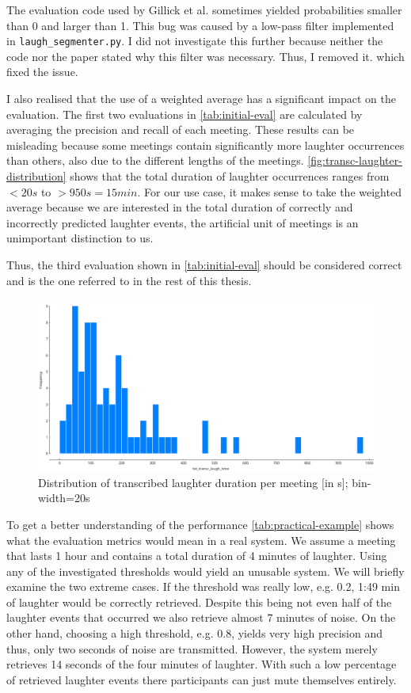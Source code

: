 \documentclass[bsc,frontabs,parskip,deptreport]{infthesis}
\begin{document}
The evaluation code used by Gillick et al. sometimes yielded probabilities smaller than 0 and larger than 1. 
This bug was caused by a low-pass filter implemented in \verb|laugh_segmenter.py|. I did not investigate this further because neither the code nor the paper stated why this filter was necessary. Thus, I removed it. which fixed the issue.

I also realised that the use of a weighted average has a significant impact on the evaluation. The first two evaluations in \autoref{tab:initial-eval} are calculated by averaging the precision and recall of each meeting.
These results can be misleading because some meetings contain significantly more laughter occurrences than others, also due to the different lengths of the meetings. \autoref{fig:transc-laughter-distribution} shows that the total duration of laughter occurrences ranges from $<20s$ to $>950s=15min$.
For our use case, it makes sense to take the weighted average because we are interested in the total duration of correctly and incorrectly predicted laughter events, the artificial unit of meetings is an unimportant distinction to us.

Thus, the third evaluation shown in \autoref{tab:initial-eval} should be considered correct and is the one referred to in the rest of this thesis.

\begin{figure}
    \centering
    \includegraphics[width=13cm]{imgs/distributions/transcribed_laughter_time_distribution.png}
    \caption{Distribution of transcribed laughter duration per meeting [in s]; bin-width=20s}
    \label{fig:transc-laughter-distribution}
\end{figure}

To get a better understanding of the performance \autoref{tab:practical-example} shows what the evaluation metrics would mean in a real system. We assume a meeting that lasts 1 hour and contains a total duration of 4 minutes of laughter. 
Using any of the investigated thresholds would yield an unusable system.
We will briefly examine the two extreme cases. If the threshold was really low, e.g. 0.2, 1:49 min of laughter would be correctly retrieved. Despite this being not even half of the laughter events that occurred we also retrieve almost 7 minutes of noise.  
On the other hand, choosing a high threshold, e.g. 0.8, yields very high precision and thus, only two seconds of noise are transmitted. However, the system merely retrieves 14 seconds of the four minutes of laughter. With such a low percentage of retrieved laughter events there participants can just mute themselves entirely. 
\end{document}
